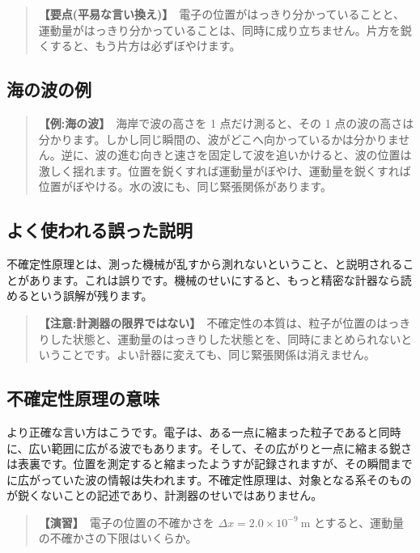\documentclass{article}
\begin{document}
\begin{quote}
\textbf{【要点(平易な言い換え)】}\ 電子の位置がはっきり分かっていることと、運動量がはっきり分かっていることは、同時に成り立ちません。片方を鋭くすると、もう片方は必ずぼやけます。
\end{quote}

\subsection{海の波の例}

\begin{quote}
\textbf{【例:海の波】}\ 海岸で波の高さを 1 点だけ測ると、その 1 点の波の高さは分かります。しかし同じ瞬間の、波がどこへ向かっているかは分かりません。逆に、波の進む向きと速さを固定して波を追いかけると、波の位置は激しく揺れます。位置を鋭くすれば運動量がぼやけ、運動量を鋭くすれば位置がぼやける。水の波にも、同じ緊張関係があります。
\end{quote}

\subsection{よく使われる誤った説明}

不確定性原理とは、測った機械が乱すから測れないということ、と説明されることがあります。これは誤りです。機械のせいにすると、もっと精密な計器なら読めるという誤解が残ります。

\begin{quote}
\textbf{【注意:計測器の限界ではない】}\ 不確定性の本質は、粒子が位置のはっきりした状態と、運動量のはっきりした状態とを、同時にまとめられないということです。よい計器に変えても、同じ緊張関係は消えません。
\end{quote}

\subsection{不確定性原理の意味}

より正確な言い方はこうです。電子は、ある一点に縮まった粒子であると同時に、広い範囲に広がる波でもあります。そして、その広がりと一点に縮まる鋭さは表裏です。位置を測定すると縮まったようすが記録されますが、その瞬間までに広がっていた波の情報は失われます。不確定性原理は、対象となる系そのものが鋭くないことの記述であり、計測器のせいではありません。

\begin{quote}
\textbf{【演習】}\ 電子の位置の不確かさを \(\Delta x = 2.0 \times 10^{-9} \ \mathrm{m}\) とすると、運動量の不確かさの下限はいくらか。
\end{quote}
\end{document}
